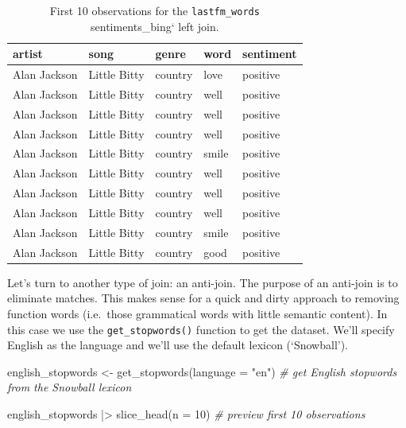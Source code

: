 \documentclass[
  letterpaper,
]{latex/krantz}
\newenvironment{Shaded}{\begin{snugshade}}{\end{snugshade}}
\newcommand{\AttributeTok}[1]{\textcolor[rgb]{0.00,0.00,0.00}{#1}}
\newcommand{\CommentTok}[1]{\textcolor[rgb]{0.00,0.00,0.00}{\textit{#1}}}
\newcommand{\DecValTok}[1]{\textcolor[rgb]{0.00,0.00,0.00}{#1}}
\newcommand{\FunctionTok}[1]{\textcolor[rgb]{0.00,0.00,0.00}{#1}}
\newcommand{\NormalTok}[1]{\textcolor[rgb]{0.00,0.00,0.00}{#1}}
\newcommand{\OtherTok}[1]{\textcolor[rgb]{0.00,0.00,0.00}{#1}}
\newcommand{\SpecialCharTok}[1]{\textcolor[rgb]{0.00,0.00,0.00}{#1}}
\newcommand{\StringTok}[1]{\textcolor[rgb]{0.00,0.00,0.00}{#1}}
\begin{document}
\begin{table}
\caption{First 10 observations for the \texttt{lastfm\_words} sentiments\_bing`
left join.}\tabularnewline

\centering
\begin{tabular}{lllll}
\toprule
artist & song & genre & word & sentiment\\
\midrule
Alan Jackson & Little Bitty & country & love & positive\\
Alan Jackson & Little Bitty & country & well & positive\\
Alan Jackson & Little Bitty & country & well & positive\\
Alan Jackson & Little Bitty & country & well & positive\\
Alan Jackson & Little Bitty & country & smile & positive\\
\addlinespace
Alan Jackson & Little Bitty & country & well & positive\\
Alan Jackson & Little Bitty & country & well & positive\\
Alan Jackson & Little Bitty & country & well & positive\\
Alan Jackson & Little Bitty & country & smile & positive\\
Alan Jackson & Little Bitty & country & good & positive\\
\bottomrule
\end{tabular}
\end{table}

Let's turn to another type of join: an anti-join. The purpose of an
anti-join is to eliminate matches. This makes sense for a quick and
dirty approach to removing function words (i.e.~those grammatical words
with little semantic content). In this case we use the
\texttt{get\_stopwords()} function to get the dataset. We'll specify
English as the language and we'll use the default lexicon (`Snowball').

\begin{Shaded}
\begin{Highlighting}[]
\NormalTok{english\_stopwords }\OtherTok{\textless{}{-}} 
  \FunctionTok{get\_stopwords}\NormalTok{(}\AttributeTok{language =} \StringTok{"en"}\NormalTok{) }\CommentTok{\# get English stopwords from the Snowball lexicon}

\NormalTok{english\_stopwords }\SpecialCharTok{|\textgreater{}} 
  \FunctionTok{slice\_head}\NormalTok{(}\AttributeTok{n =} \DecValTok{10}\NormalTok{) }\CommentTok{\# preview first 10 observations}
\end{Highlighting}
\end{Shaded}
\end{document}
